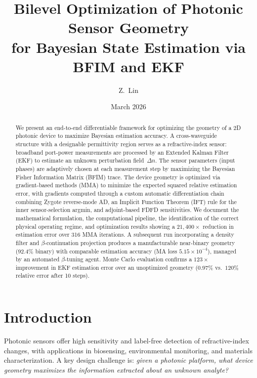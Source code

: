 \documentclass[11pt,a4paper]{article}
\title{Bilevel Optimization of Photonic Sensor Geometry\\for Bayesian State Estimation via BFIM and EKF}
\author{Z.\ Lin}
\date{March 2026}
\begin{document}
\maketitle

\begin{abstract}
We present an end-to-end differentiable framework for optimizing the geometry of a 2D photonic device to maximize Bayesian estimation accuracy.  A cross-waveguide structure with a designable permittivity region serves as a refractive-index sensor: broadband port-power measurements are processed by an Extended Kalman Filter (EKF) to estimate an unknown perturbation field~$\Delta n$.  The sensor parameters (input phases) are adaptively chosen at each measurement step by maximizing the Bayesian Fisher Information Matrix (BFIM) trace.  The device geometry is optimized via gradient-based methods (MMA) to minimize the expected squared relative estimation error, with gradients computed through a custom automatic differentiation chain combining Zygote reverse-mode AD, an Implicit Function Theorem (IFT) rule for the inner sensor-selection argmin, and adjoint-based FDFD sensitivities.  We document the mathematical formulation, the computational pipeline, the identification of the correct physical operating regime, and optimization results showing a $21{,}400\times$ reduction in estimation error over 316 MMA iterations.  A subsequent run incorporating a density filter and $\beta$-continuation projection produces a manufacturable near-binary geometry (92.4\% binary) with comparable estimation accuracy (MA loss $5.15 \times 10^{-4}$), managed by an automated $\beta$-tuning agent.  Monte Carlo evaluation confirms a $123\times$ improvement in EKF estimation error over an unoptimized geometry ($0.97\%$ vs.\ $120\%$ relative error after 10 steps).
\end{abstract}

\tableofcontents
\newpage

\section{Introduction}

Photonic sensors offer high sensitivity and label-free detection of refractive-index changes, with applications in biosensing, environmental monitoring, and materials characterization.  A key design challenge is: \emph{given a photonic platform, what device geometry maximizes the information extracted about an unknown analyte?}
\end{document}
